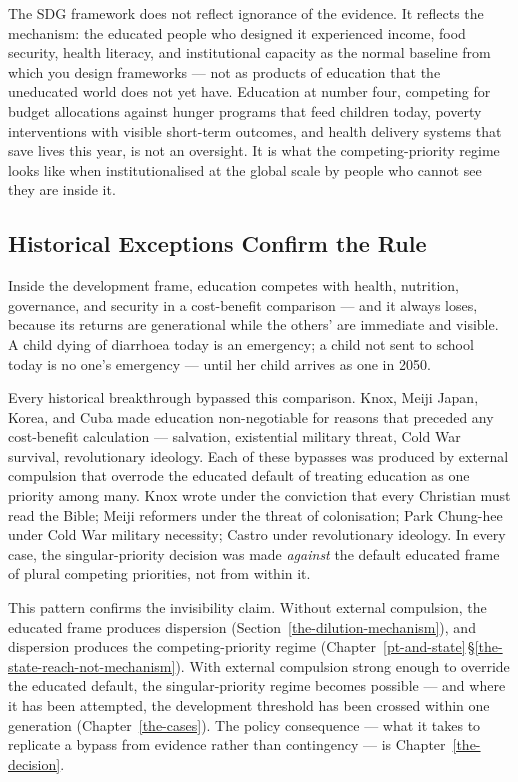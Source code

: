 \documentclass[12pt,letterpaper]{article}
\begin{document}
The SDG framework does not reflect ignorance of the evidence. It reflects the
mechanism: the educated people who designed it experienced income, food
security, health literacy, and institutional capacity as the normal
baseline from which you design frameworks --- not as products of
education that the uneducated world does not yet have. Education at
number four, competing for budget allocations against hunger programs
that feed children today, poverty interventions with visible short-term
outcomes, and health delivery systems that save lives this year, is not
an oversight. It is what the competing-priority regime looks like when
institutionalised at the global scale by people who cannot see they are
inside it.

\subsection{Historical Exceptions Confirm the Rule}\label{historical-exceptions-confirm-the-rule}

Inside the development frame, education competes with health,
nutrition, governance, and security in a cost-benefit comparison ---
and it always loses, because its returns are generational while the
others' are immediate and visible. A child dying of diarrhoea today is
an emergency; a child not sent to school today is no one's emergency
--- until her child arrives as one in 2050.

Every historical breakthrough bypassed this comparison. Knox, Meiji
Japan, Korea, and Cuba made education non-negotiable for reasons that
preceded any cost-benefit calculation --- salvation, existential
military threat, Cold War survival, revolutionary ideology. Each of
these bypasses was produced by external compulsion that overrode the
educated default of treating education as one priority among many.
Knox wrote under the conviction that every Christian must read the
Bible; Meiji reformers under the threat of colonisation; Park
Chung-hee under Cold War military necessity; Castro under
revolutionary ideology. In every case, the singular-priority decision
was made \emph{against} the default educated frame of plural
competing priorities, not from within it.

This pattern confirms the invisibility claim. Without external
compulsion, the educated frame produces dispersion (Section~\ref{the-dilution-mechanism}),
and dispersion produces the competing-priority regime
(Chapter~\ref{pt-and-state}\,\S\ref{the-state-reach-not-mechanism}).
With external compulsion strong enough to override the educated
default, the singular-priority regime becomes possible --- and where
it has been attempted, the development threshold has been crossed
within one generation (Chapter~\ref{the-cases}). The policy consequence
--- what it takes to replicate a bypass from evidence rather than
contingency --- is Chapter~\ref{the-decision}.
\end{document}
